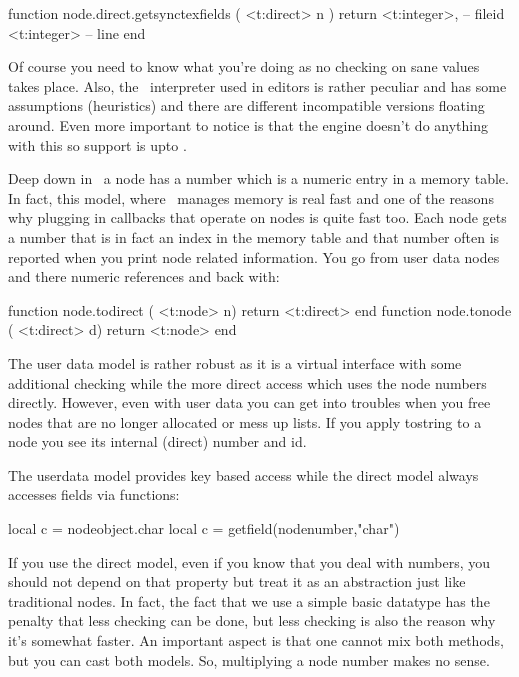 function node.direct.getsynctexfields ( <t:direct> n )
    return
        <t:integer>, -- fileid
        <t:integer>  -- line
end
\stoptyping

Of course you need to know what you're doing as no checking on sane values takes
place. Also, the \SYNCTEX\ interpreter used in editors is rather peculiar and has
some assumptions (heuristics) and there are different incompatible versions
floating around. Even more important to notice is that the engine doesn't do
anything with this so support is upto \LUA.

\stopsubsection

\startsubsection[title={Two access models}]

Deep down in \TEX\ a node has a number which is a numeric entry in a memory
table. In fact, this model, where \TEX\ manages memory is real fast and one of
the reasons why plugging in callbacks that operate on nodes is quite fast too.
Each node gets a number that is in fact an index in the memory table and that
number often is reported when you print node related information. You go from
user data nodes and there numeric references and back with:

\starttyping[option=LUA]
function node.todirect ( <t:node>   n) return <t:direct> end
function node.tonode   ( <t:direct> d) return <t:node>   end
\stoptyping

The user data model is rather robust as it is a virtual interface with some
additional checking while the more direct access which uses the node numbers
directly. However, even with user data you can get into troubles when you free
nodes that are no longer allocated or mess up lists. If you apply \type
{tostring} to a node you see its internal (direct) number and id.

The userdata model provides key based access while the direct model always
accesses fields via functions:

\starttyping[option=LUA]
local c = nodeobject.char
local c = getfield(nodenumber,"char")
\stoptyping

If you use the direct model, even if you know that you deal with numbers, you
should not depend on that property but treat it as an abstraction just like
traditional nodes. In fact, the fact that we use a simple basic datatype has the
penalty that less checking can be done, but less checking is also the reason why
it's somewhat faster. An important aspect is that one cannot mix both methods,
but you can cast both models. So, multiplying a node number makes no sense.

